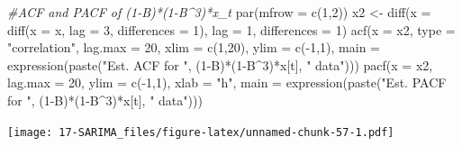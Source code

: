 \documentclass[
]{book}
\newenvironment{Shaded}{\begin{snugshade}}{\end{snugshade}}
\newcommand{\AttributeTok}[1]{\textcolor[rgb]{0.77,0.63,0.00}{#1}}
\newcommand{\CommentTok}[1]{\textcolor[rgb]{0.56,0.35,0.01}{\textit{#1}}}
\newcommand{\DecValTok}[1]{\textcolor[rgb]{0.00,0.00,0.81}{#1}}
\newcommand{\FunctionTok}[1]{\textcolor[rgb]{0.00,0.00,0.00}{#1}}
\newcommand{\NormalTok}[1]{#1}
\newcommand{\OtherTok}[1]{\textcolor[rgb]{0.56,0.35,0.01}{#1}}
\newcommand{\SpecialCharTok}[1]{\textcolor[rgb]{0.00,0.00,0.00}{#1}}
\newcommand{\StringTok}[1]{\textcolor[rgb]{0.31,0.60,0.02}{#1}}
\theoremstyle{definition}
\theoremstyle{definition}
\theoremstyle{definition}
\theoremstyle{definition}
\theoremstyle{remark}
\begin{document}
\begin{Shaded}
\begin{Highlighting}[]
 \CommentTok{\#ACF and PACF of (1{-}B)*(1{-}B\^{}3)*x\_t}
  \FunctionTok{par}\NormalTok{(}\AttributeTok{mfrow =} \FunctionTok{c}\NormalTok{(}\DecValTok{1}\NormalTok{,}\DecValTok{2}\NormalTok{))}
\NormalTok{  x2 }\OtherTok{\textless{}{-}} \FunctionTok{diff}\NormalTok{(}\AttributeTok{x =} \FunctionTok{diff}\NormalTok{(}\AttributeTok{x =}\NormalTok{ x, }\AttributeTok{lag =} \DecValTok{3}\NormalTok{, }\AttributeTok{differences =} \DecValTok{1}\NormalTok{), }\AttributeTok{lag =} \DecValTok{1}\NormalTok{, }\AttributeTok{differences =} \DecValTok{1}\NormalTok{)}
  \FunctionTok{acf}\NormalTok{(}\AttributeTok{x =}\NormalTok{ x2, }\AttributeTok{type =} \StringTok{"correlation"}\NormalTok{, }\AttributeTok{lag.max =} \DecValTok{20}\NormalTok{, }\AttributeTok{xlim =} \FunctionTok{c}\NormalTok{(}\DecValTok{1}\NormalTok{,}\DecValTok{20}\NormalTok{),}
      \AttributeTok{ylim =} \FunctionTok{c}\NormalTok{(}\SpecialCharTok{{-}}\DecValTok{1}\NormalTok{,}\DecValTok{1}\NormalTok{), }\AttributeTok{main =} \FunctionTok{expression}\NormalTok{(}\FunctionTok{paste}\NormalTok{(}\StringTok{"Est. ACF for "}\NormalTok{, (}\DecValTok{1}\SpecialCharTok{{-}}\NormalTok{B)}\SpecialCharTok{*}\NormalTok{(}\DecValTok{1}\SpecialCharTok{{-}}\NormalTok{B}\SpecialCharTok{\^{}}\DecValTok{3}\NormalTok{)}\SpecialCharTok{*}\NormalTok{x[t], }\StringTok{" data"}\NormalTok{)))}
  \FunctionTok{pacf}\NormalTok{(}\AttributeTok{x =}\NormalTok{ x2, }\AttributeTok{lag.max =} \DecValTok{20}\NormalTok{, }\AttributeTok{ylim =} \FunctionTok{c}\NormalTok{(}\SpecialCharTok{{-}}\DecValTok{1}\NormalTok{,}\DecValTok{1}\NormalTok{), }\AttributeTok{xlab =} \StringTok{"h"}\NormalTok{, }
       \AttributeTok{main =} \FunctionTok{expression}\NormalTok{(}\FunctionTok{paste}\NormalTok{(}\StringTok{"Est. PACF for "}\NormalTok{, (}\DecValTok{1}\SpecialCharTok{{-}}\NormalTok{B)}\SpecialCharTok{*}\NormalTok{(}\DecValTok{1}\SpecialCharTok{{-}}\NormalTok{B}\SpecialCharTok{\^{}}\DecValTok{3}\NormalTok{)}\SpecialCharTok{*}\NormalTok{x[t], }\StringTok{" data"}\NormalTok{)))}
\end{Highlighting}
\end{Shaded}

\texttt{[image: 17-SARIMA\_files/figure-latex/unnamed-chunk-57-1.pdf]}
\end{document}
